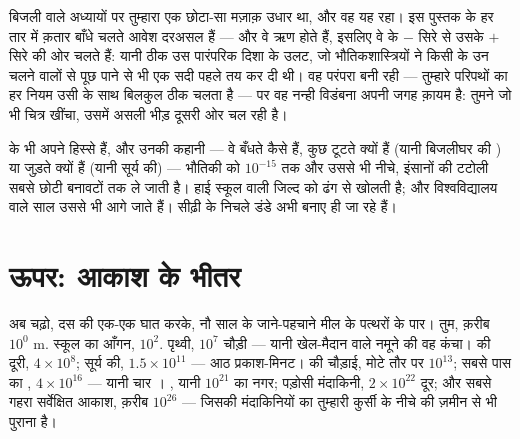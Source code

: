 \begin{example}[वह पुराना मज़ाक़, चुकता]\label{ex:g9:atoms-to-galaxies:electron}
बिजली वाले अध्यायों पर तुम्हारा एक छोटा-सा मज़ाक़ उधार था, और वह यह
रहा। इस पुस्तक के हर तार में क़तार बाँधे चलते आवेश दरअसल
\emph{} हैं --- और वे ऋण होते हैं, इसलिए वे  के $-$ सिरे
से उसके $+$ सिरे की ओर चलते हैं: यानी ठीक उस पारंपरिक दिशा के उलट, जो
भौतिकशास्त्रियों ने किसी के उन चलने वालों से पूछ पाने से भी एक सदी
पहले तय कर दी थी। वह परंपरा बनी रही --- तुम्हारे परिपथों का हर नियम उसी
के साथ बिलकुल ठीक चलता है --- पर वह नन्ही विडंबना अपनी जगह क़ायम है:
तुमने जो भी चित्र खींचा, उसमें असली भीड़ दूसरी ओर चल रही है।
\end{example}

\begin{example}[और उससे भी नीचे]\label{ex:g9:atoms-to-galaxies:deeper}
 के भी अपने हिस्से हैं, और उनकी कहानी --- वे बँधते कैसे हैं, कुछ
 टूटते क्यों हैं (यानी बिजलीघर की ) या जुड़ते क्यों हैं
(यानी सूर्य की) --- भौतिकी को $10^{-15}$  तक और उससे भी नीचे,
इंसानों की टटोली सबसे छोटी बनावटों तक ले जाती है। हाई स्कूल वाली जिल्द
 को ढंग से खोलती है; और विश्वविद्यालय वाले साल उससे भी आगे जाते
हैं। सीढ़ी के निचले डंडे अभी बनाए ही जा रहे हैं।
\end{example}

\section{ऊपर: आकाश के भीतर}

\begin{example}[चढ़ाई]\label{ex:g9:atoms-to-galaxies:ascent}
अब चढ़ो, दस की एक-एक घात करके, नौ साल के जाने-पहचाने मील के पत्थरों के
पार। तुम, क़रीब $10^{0}$ \unit{m}. स्कूल का आँगन, $10^{2}$. पृथ्वी,
$10^{7}$ चौड़ी --- यानी खेल-मैदान वाले नमूने की वह कंचा।  की
दूरी, $4 \times 10^{8}$; सूर्य की, $1.5 \times 10^{11}$ --- आठ
प्रकाश-मिनट।  की चौड़ाई, मोटे तौर पर $10^{13}$; सबसे पास का
, $4 \times 10^{16}$ --- यानी चार । , यानी
$10^{21}$  का नगर; पड़ोसी मंदाकिनी, $2 \times 10^{22}$ दूर; और
सबसे गहरा सर्वेक्षित आकाश, क़रीब $10^{26}$  --- जिसकी मंदाकिनियों
का  तुम्हारी कुर्सी के नीचे की ज़मीन से भी पुराना है।
\end{example}

